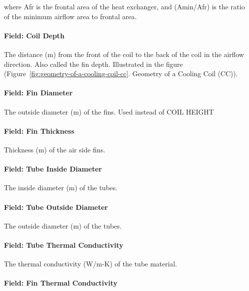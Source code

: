 where Afr is the frontal area of the heat exchanger, and (Amin/Afr) is the ratio of the minimum airflow area to frontal area.

\paragraph{Field: Coil Depth}\label{field-coil-depth}

The distance (m) from the front of the coil to the back of the coil in the airflow direction. Also called the fin depth. Illustrated in the figure (Figure~\ref{fig:geometry-of-a-cooling-coil-cc}. Geometry of a Cooling Coil (CC)).

\paragraph{Field: Fin Diameter}\label{field-fin-diameter}

The outside diameter (m) of the fins. Used instead of COIL HEIGHT

\paragraph{Field: Fin Thickness}\label{field-fin-thickness}

Thickness (m) of the air side fins.

\paragraph{Field: Tube Inside Diameter}\label{field-tube-inside-diameter}

The inside diameter (m) of the tubes.

\paragraph{Field: Tube Outside Diameter}\label{field-tube-outside-diameter}

The outside diameter (m) of the tubes.

\paragraph{Field: Tube Thermal Conductivity}\label{field-tube-thermal-conductivity}

The thermal conductivity (W/m-K) of the tube material.

\paragraph{Field: Fin Thermal Conductivity}\label{field-fin-thermal-conductivity}

